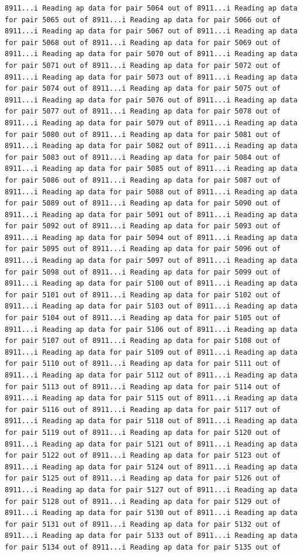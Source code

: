\documentclass[
]{article}
\begin{document}
\begin{verbatim}
8911...i Reading ap data for pair 5064 out of 8911...i Reading ap data for pair 5065 out of 8911...i Reading ap data for pair 5066 out of 8911...i Reading ap data for pair 5067 out of 8911...i Reading ap data for pair 5068 out of 8911...i Reading ap data for pair 5069 out of 8911...i Reading ap data for pair 5070 out of 8911...i Reading ap data for pair 5071 out of 8911...i Reading ap data for pair 5072 out of 8911...i Reading ap data for pair 5073 out of 8911...i Reading ap data for pair 5074 out of 8911...i Reading ap data for pair 5075 out of 8911...i Reading ap data for pair 5076 out of 8911...i Reading ap data for pair 5077 out of 8911...i Reading ap data for pair 5078 out of 8911...i Reading ap data for pair 5079 out of 8911...i Reading ap data for pair 5080 out of 8911...i Reading ap data for pair 5081 out of 8911...i Reading ap data for pair 5082 out of 8911...i Reading ap data for pair 5083 out of 8911...i Reading ap data for pair 5084 out of 8911...i Reading ap data for pair 5085 out of 8911...i Reading ap data for pair 5086 out of 8911...i Reading ap data for pair 5087 out of 8911...i Reading ap data for pair 5088 out of 8911...i Reading ap data for pair 5089 out of 8911...i Reading ap data for pair 5090 out of 8911...i Reading ap data for pair 5091 out of 8911...i Reading ap data for pair 5092 out of 8911...i Reading ap data for pair 5093 out of 8911...i Reading ap data for pair 5094 out of 8911...i Reading ap data for pair 5095 out of 8911...i Reading ap data for pair 5096 out of 8911...i Reading ap data for pair 5097 out of 8911...i Reading ap data for pair 5098 out of 8911...i Reading ap data for pair 5099 out of 8911...i Reading ap data for pair 5100 out of 8911...i Reading ap data for pair 5101 out of 8911...i Reading ap data for pair 5102 out of 8911...i Reading ap data for pair 5103 out of 8911...i Reading ap data for pair 5104 out of 8911...i Reading ap data for pair 5105 out of 8911...i Reading ap data for pair 5106 out of 8911...i Reading ap data for pair 5107 out of 8911...i Reading ap data for pair 5108 out of 8911...i Reading ap data for pair 5109 out of 8911...i Reading ap data for pair 5110 out of 8911...i Reading ap data for pair 5111 out of 8911...i Reading ap data for pair 5112 out of 8911...i Reading ap data for pair 5113 out of 8911...i Reading ap data for pair 5114 out of 8911...i Reading ap data for pair 5115 out of 8911...i Reading ap data for pair 5116 out of 8911...i Reading ap data for pair 5117 out of 8911...i Reading ap data for pair 5118 out of 8911...i Reading ap data for pair 5119 out of 8911...i Reading ap data for pair 5120 out of 8911...i Reading ap data for pair 5121 out of 8911...i Reading ap data for pair 5122 out of 8911...i Reading ap data for pair 5123 out of 8911...i Reading ap data for pair 5124 out of 8911...i Reading ap data for pair 5125 out of 8911...i Reading ap data for pair 5126 out of 8911...i Reading ap data for pair 5127 out of 8911...i Reading ap data for pair 5128 out of 8911...i Reading ap data for pair 5129 out of 8911...i Reading ap data for pair 5130 out of 8911...i Reading ap data for pair 5131 out of 8911...i Reading ap data for pair 5132 out of 8911...i Reading ap data for pair 5133 out of 8911...i Reading ap data for pair 5134 out of 8911...i Reading ap data for pair 5135 out of 
\end{verbatim}
\end{document}
